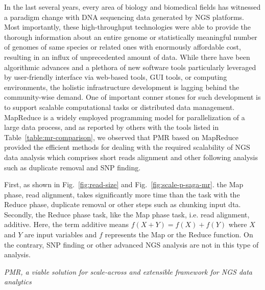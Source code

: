\documentclass{sig-alternate}
\begin{document}
{In the last several years, every area of biology and biomedical fields
has witnessed a paradigm change with DNA sequencing data generated by
NGS
platforms\cite{metzker2010,1000genome,wang2009-natrevgen,alex2009,mcpherson2009}.
Most importantly, these high-throughput technologies were able to
provide the thorough information about an entire genome or
statistically meaningful number of genomes of same species or related
ones with enormously affordable cost, resulting in an influx of
unprecedented amount of data.  While there have been algorithmic
advances and a plethora of new software tools particularly leveraged
by user-friendly interface via web-based tools, GUI tools, or
computing environments\cite{galaxy}, the holistic infrastructure
development is lagging behind the community-wise demand.  One of
important conner stones for such development is to support scalable
computational tasks or distributed data management.  MapReduce is a
widely employed programming model for parallelization of a large data
process, and as reported by others with the tools listed in
Table~\ref{table:mr-comparison}, we observed that PMR based on
MapReduce provided the efficient methods for dealing with the required
scalability of NGS data analysis which comprises short reads alignment
and other following analysis such as duplicate removal and SNP
finding.

First, as shown in  Fig.~\ref{fig:read-size} and Fig.~\ref{fig:scale-p-saga-mr}. the Map phase, read alignment, takes significantly more time than the task with the Reduce phase, duplicate removal or other steps such as chunking input dta.  Secondly, the Reduce phase task, like the Map phase task, i.e. read alignment, additive.  Here, the term additive means $f(X + Y) = f(X) + f(Y)$ where $X$ and $Y$ are input variables and $f$ represents the Map or the Reduce function.  On the contrary, SNP finding or other advanced NGS analysis are not in this type of analysis.   


\textit{PMR, a viable solution for scale-across and extensible framework for NGS data analytics}

}
\end{document}
